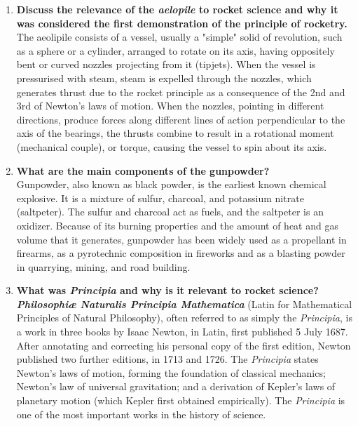 \documentclass{article}
\begin{document}
\begin{enumerate}
	\item {\bf Discuss the relevance of the \textit{aelopile} to rocket science and why it was considered the first demonstration of the principle of rocketry.}\\

The aeolipile consists of a vessel, usually a "simple" solid of revolution, such as a sphere or a cylinder, arranged to rotate on its axis, having oppositely bent or curved nozzles projecting from it (tipjets). When the vessel is pressurised with steam, steam is expelled through the nozzles, which generates thrust due to the rocket principle as a consequence of the 2nd and 3rd of Newton's laws of motion. When the nozzles, pointing in different directions, produce forces along different lines of action perpendicular to the axis of the bearings, the thrusts combine to result in a rotational moment (mechanical couple), or torque, causing the vessel to spin about its axis. \cite{aeolipile}

	\item {\bf What are the main components of the gunpowder?}\\
	
Gunpowder, also known as black powder, is the earliest known chemical explosive. It is a mixture of sulfur, charcoal, and potassium nitrate (saltpeter). The sulfur and charcoal act as fuels, and the saltpeter is an oxidizer. Because of its burning properties and the amount of heat and gas volume that it generates, gunpowder has been widely used as a propellant in firearms, as a pyrotechnic composition in fireworks and as a blasting powder in quarrying, mining, and road building. \cite{gunpowder}
	
	\item {\bf What was \textit{Principia} and why is it relevant to rocket science?}\\

\textit{\textbf{Philosophiæ Naturalis Principia Mathematica}} (Latin for Mathematical Principles of Natural Philosophy), often referred to as simply the \textit{Principia}, is a work in three books by Isaac Newton, in Latin, first published 5 July 1687. After annotating and correcting his personal copy of the first edition, Newton published two further editions, in 1713 and 1726. The \textit{Principia} states Newton's laws of motion, forming the foundation of classical mechanics; Newton's law of universal gravitation; and a derivation of Kepler's laws of planetary motion (which Kepler first obtained empirically). The \textit{Principia} is one of the most important works in the history of science. \cite{principia}


\end{enumerate}
\end{document}
